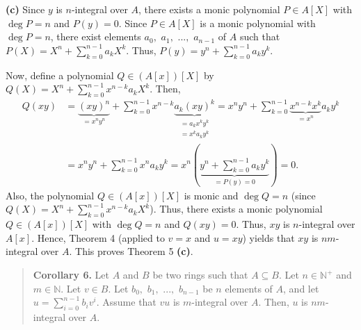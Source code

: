 \documentclass[12pt,final,notitlepage,onecolumn]{article}%
\begin{document}
\textbf{(c)} Since $y$ is $n$-integral over $A$, there exists a monic
polynomial $P\in A\left[  X\right]  $ with $\deg P=n$ and $P\left(  y\right)
=0$. Since $P\in A\left[  X\right]  $ is a monic polynomial with $\deg P=n$,
there exist elements $a_{0},$ $a_{1},$ $...,$ $a_{n-1}$ of $A$ such that
$P\left(  X\right)  =X^{n}+\sum\limits_{k=0}^{n-1}a_{k}X^{k}$. Thus, $P\left(
y\right)  =y^{n}+\sum\limits_{k=0}^{n-1}a_{k}y^{k}$.

Now, define a polynomial $Q\in\left(  A\left[  x\right]  \right)  \left[
X\right]  $ by $Q\left(  X\right)  =X^{n}+\sum\limits_{k=0}^{n-1}x^{n-k}%
a_{k}X^{k}$. Then,%
\begin{align*}
Q\left(  xy\right)   &  =\underbrace{\left(  xy\right)  ^{n}}_{=x^{n}y^{n}%
}+\sum\limits_{k=0}^{n-1}x^{n-k}\underbrace{a_{k}\left(  xy\right)  ^{k}%
}_{\substack{=a_{k}x^{k}y^{k}\\=x^{k}a_{k}y^{k}}}=x^{n}y^{n}+\sum
\limits_{k=0}^{n-1}\underbrace{x^{n-k}x^{k}}_{=x^{n}}a_{k}y^{k}\\
&  =x^{n}y^{n}+\sum\limits_{k=0}^{n-1}x^{n}a_{k}y^{k}=x^{n}\left(
\underbrace{y^{n}+\sum\limits_{k=0}^{n-1}a_{k}y^{k}}_{=P\left(  y\right)
=0}\right)  =0.
\end{align*}
Also, the polynomial $Q\in\left(  A\left[  x\right]  \right)  \left[
X\right]  $ is monic and $\deg Q=n$ (since $Q\left(  X\right)  =X^{n}%
+\sum\limits_{k=0}^{n-1}x^{n-k}a_{k}X^{k}$). Thus, there exists a monic
polynomial $Q\in\left(  A\left[  x\right]  \right)  \left[  X\right]  $ with
$\deg Q=n$ and $Q\left(  xy\right)  =0$. Thus, $xy$ is $n$-integral over
$A\left[  x\right]  $. Hence, Theorem 4 (applied to $v=x$ and $u=xy$) yields
that $xy$ is $nm$-integral over $A$. This proves Theorem 5 \textbf{(c)}.

\begin{quote}
\textbf{Corollary 6.} Let $A$ and $B$ be two rings such that $A\subseteq B$.
Let $n\in\mathbb{N}^{+}$ and $m\in\mathbb{N}$. Let $v\in B$. Let $b_{0},$
$b_{1},$ $...,$ $b_{n-1}$ be $n$ elements of $A$, and let $u=\sum
\limits_{i=0}^{n-1}b_{i}v^{i}$. Assume that $vu$ is $m$-integral over $A$.
Then, $u$ is $nm$-integral over $A$.
\end{quote}
\end{document}
